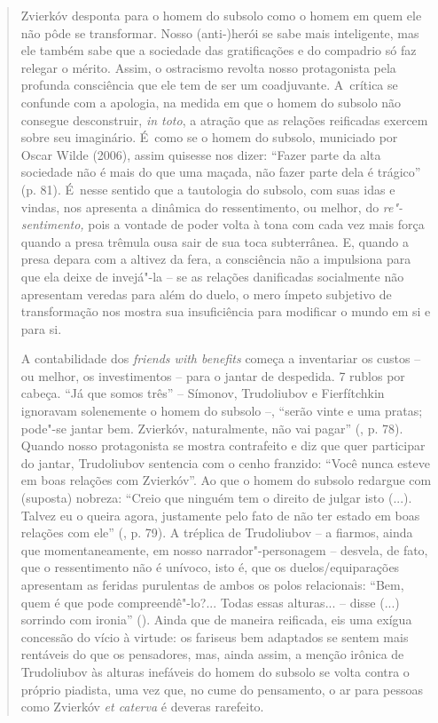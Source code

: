{\begin{quote}
Zvierkóv desponta para o homem do subsolo como o homem em quem ele não
pôde se transformar. Nosso (anti-)herói se sabe mais inteligente, mas
ele também sabe que a sociedade das gratificações e do compadrio só faz
relegar o mérito. Assim, o ostracismo revolta nosso protagonista pela
profunda consciência que ele tem de ser um coadjuvante. A~crítica se
confunde com a apologia, na medida em que o homem do subsolo não
consegue desconstruir, \emph{in toto}, a atração que as relações
reificadas exercem sobre seu imaginário. É~como se o homem do subsolo,
municiado por Oscar Wilde (2006), assim quisesse nos dizer: ``Fazer
parte da alta sociedade não é mais do que uma maçada, não fazer parte
dela é trágico'' (p. 81). É~nesse sentido que a tautologia do subsolo,
com suas idas e vindas, nos apresenta a dinâmica do ressentimento, ou
melhor, do \emph{re"-sentimento,} pois a vontade de poder volta à tona
com cada vez mais força quando a presa trêmula ousa sair de sua toca
subterrânea. E, quando a presa depara com a altivez da fera, a
consciência não a impulsiona para que ela deixe de invejá"-la -- se as
relações danificadas socialmente não apresentam veredas para além do
duelo, o mero ímpeto subjetivo de transformação nos mostra sua
insuficiência para modificar o mundo em si e para si.

A contabilidade dos \emph{friends with benefits} começa a inventariar os
custos -- ou melhor, os investimentos -- para o jantar de despedida. 7
rublos por cabeça. ``Já que somos três'' -- Símonov, Trudoliubov e
Fierfítchkin ignoravam solenemente o homem do subsolo --, ``serão vinte
e uma pratas; pode"-se jantar bem. Zvierkóv, naturalmente, não vai
pagar'' (, p. 78). Quando nosso protagonista se mostra contrafeito e
diz que quer participar do jantar, Trudoliubov sentencia com o cenho
franzido: ``Você nunca esteve em boas relações com Zvierkóv''. Ao que o
homem do subsolo redargue com (suposta) nobreza: ``Creio que ninguém tem
o direito de julgar isto (...). Talvez eu o queira agora, justamente
pelo fato de não ter estado em boas relações com ele'' (, p. 79). A
tréplica de Trudoliubov -- a fiarmos, ainda que momentaneamente, em
nosso narrador"-personagem -- desvela, de fato, que o ressentimento não é
unívoco, isto é, que os duelos/equiparações apresentam as feridas
purulentas de ambos os polos relacionais: ``Bem, quem é que pode
compreendê"-lo?... Todas essas alturas... -- disse (...) sorrindo com
ironia'' (). Ainda que de maneira reificada, eis uma exígua
concessão do vício à virtude: os fariseus bem adaptados se sentem mais
rentáveis do que os pensadores, mas, ainda assim, a menção irônica de
Trudoliubov às alturas inefáveis do homem do subsolo se volta contra o
próprio piadista, uma vez que, no cume do pensamento, o ar para pessoas
como Zvierkóv \emph{et caterva} é deveras rarefeito.


\end{quote}}
